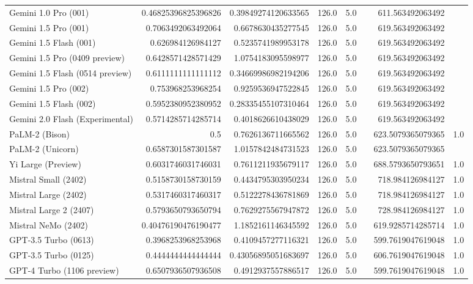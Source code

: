 \begin{table}[htp]
{\begin{tabular}{lrrrrrrr}
Gemini 1.0 Pro (001) & 0.46825396825396826 & 0.39849274120633565 & 126.0 & 5.0 &  & 611.563492063492 &  \\
Gemini 1.5 Pro (001) & 0.7063492063492064 & 0.6678630435277545 & 126.0 & 5.0 &  & 619.563492063492 &  \\
Gemini 1.5 Flash (001) & 0.626984126984127 & 0.5235741989953178 & 126.0 & 5.0 &  & 619.563492063492 &  \\
Gemini 1.5 Pro (0409 preview) & 0.6428571428571429 & 1.0754183095598977 & 126.0 & 5.0 &  & 619.563492063492 &  \\
Gemini 1.5 Flash (0514 preview) & 0.6111111111111112 & 0.34669986982194206 & 126.0 & 5.0 &  & 619.563492063492 &  \\
Gemini 1.5 Pro (002) & 0.753968253968254 & 0.9259536947522845 & 126.0 & 5.0 &  & 619.563492063492 &  \\
Gemini 1.5 Flash (002) & 0.5952380952380952 & 0.28335455107310464 & 126.0 & 5.0 &  & 619.563492063492 &  \\
Gemini 2.0 Flash (Experimental) & 0.5714285714285714 & 0.4018626610438029 & 126.0 & 5.0 &  & 619.563492063492 &  \\
PaLM-2 (Bison) & 0.5 & 0.7626136711665562 & 126.0 & 5.0 &  & 623.5079365079365 & 1.0 \\
PaLM-2 (Unicorn) & 0.6587301587301587 & 1.0157842484731523 & 126.0 & 5.0 &  & 623.5079365079365 &  \\
Yi Large (Preview) & 0.6031746031746031 & 0.7611211935679117 & 126.0 & 5.0 &  & 688.5793650793651 & 1.0 \\
Mistral Small (2402) & 0.5158730158730159 & 0.4434795303950234 & 126.0 & 5.0 &  & 718.984126984127 & 1.0 \\
Mistral Large (2402) & 0.5317460317460317 & 0.5122278436781869 & 126.0 & 5.0 &  & 718.984126984127 & 1.0 \\
Mistral Large 2 (2407) & 0.5793650793650794 & 0.7629275567947872 & 126.0 & 5.0 &  & 728.984126984127 & 1.0 \\
Mistral NeMo (2402) & 0.40476190476190477 & 1.1852161146345592 & 126.0 & 5.0 &  & 619.9285714285714 & 1.0 \\
GPT-3.5 Turbo (0613) & 0.3968253968253968 & 0.4109457277116321 & 126.0 & 5.0 &  & 599.7619047619048 & 1.0 \\
GPT-3.5 Turbo (0125) & 0.4444444444444444 & 0.43056895051683697 & 126.0 & 5.0 &  & 606.7619047619048 & 1.0 \\
GPT-4 Turbo (1106 preview) & 0.6507936507936508 & 0.4912937557886517 & 126.0 & 5.0 &  & 599.7619047619048 & 1.0 \\

\end{tabular}}
\end{table}
